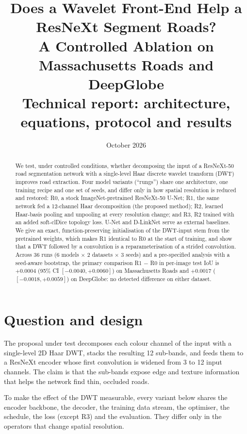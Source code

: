\documentclass[11pt]{article}
\title{Does a Wavelet Front-End Help a ResNeXt Segment Roads?\\[0.3em]
\large A Controlled Ablation on Massachusetts Roads and DeepGlobe\\
\normalsize Technical report: architecture, equations, protocol and results}
\author{}
\date{October 2026}
\begin{document}
\maketitle

\begin{abstract}
We test, under controlled conditions, whether decomposing the input of a ResNeXt-50 road
segmentation network with a single-level Haar discrete wavelet transform (DWT) improves road
extraction. Four model variants (``rungs'') share one architecture, one training recipe and one
set of seeds, and differ only in how spatial resolution is reduced and restored: R0, a stock
ImageNet-pretrained ResNeXt-50 U-Net; R1, the same network fed a 12-channel Haar decomposition
(the proposed method); R2, learned Haar-basis pooling and unpooling at every resolution change;
and R3, R2 trained with an added soft-clDice topology loss. U-Net and D-LinkNet serve as external
baselines. We give an exact, function-preserving initialisation of the DWT-input stem from the
pretrained weights, which makes R1 identical to R0 at the start of training, and show that a DWT
followed by a convolution is a reparameterisation of a strided convolution. Across 36 runs
(6 models $\times$ 2 datasets $\times$ 3 seeds) and a pre-specified analysis with a seed-aware
bootstrap, the primary comparison R1 $-$ R0 in per-image test IoU is $+0.0004$
(95\% CI $[-0.0040, +0.0060]$) on Massachusetts Roads and $+0.0017$ ($[-0.0018, +0.0059]$) on
DeepGlobe: no detected difference on either dataset.
\end{abstract}

\tableofcontents
\newpage

\section{Question and design}

The proposal under test decomposes each colour channel of the input with a single-level 2D
Haar DWT, stacks the resulting 12 sub-bands, and feeds them to a ResNeXt encoder whose first
convolution is widened from 3 to 12 input channels. The claim is that the sub-bands expose edge
and texture information that helps the network find thin, occluded roads.

To make the effect of the DWT measurable, every variant below shares the encoder backbone, the
decoder, the training data stream, the optimiser, the schedule, the loss (except R3) and the
evaluation. They differ only in the operators that change spatial resolution.
\end{document}
